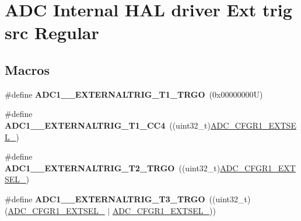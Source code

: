 \hypertarget{group___a_d_c___internal___h_a_l__driver___ext__trig__src___regular}{}\section{A\+DC Internal H\+AL driver Ext trig src Regular}
\label{group___a_d_c___internal___h_a_l__driver___ext__trig__src___regular}
\subsection*{Macros}
\begin{DoxyCompactItemize}
\item 
\mbox{\label{group___a_d_c___internal___h_a_l__driver___ext__trig__src___regular_gaaa9a402d55b7d3b9412ad2d9c8b3c596}} 
\#define {\bfseries A\+D\+C1\+\_\+\_\+\+E\+X\+T\+E\+R\+N\+A\+L\+T\+R\+I\+G\+\_\+\+T1\+\_\+\+T\+R\+GO}~(0x00000000\+U)
\item 
\mbox{\label{group___a_d_c___internal___h_a_l__driver___ext__trig__src___regular_ga67ffe1784bc032efb1ea187d8aefc7d1}} 
\#define {\bfseries A\+D\+C1\+\_\+\_\+\+E\+X\+T\+E\+R\+N\+A\+L\+T\+R\+I\+G\+\_\+\+T1\+\_\+\+C\+C4}~((uint32\+\_\+t)\hyperlink{group___peripheral___registers___bits___definition_ga6b23e26a7ff780ae4a913f9eb3c4fafb}{A\+D\+C\+\_\+\+C\+F\+G\+R1\+\_\+\+E\+X\+T\+S\+E\+L\+\_})
\item 
\mbox{\label{group___a_d_c___internal___h_a_l__driver___ext__trig__src___regular_ga4f651a2afa7c5e18d9ad2e3f5742d1c1}} 
\#define {\bfseries A\+D\+C1\+\_\+\_\+\+E\+X\+T\+E\+R\+N\+A\+L\+T\+R\+I\+G\+\_\+\+T2\+\_\+\+T\+R\+GO}~((uint32\+\_\+t)\hyperlink{group___peripheral___registers___bits___definition_gabd08752ec8996d12b0dbf1b555f4a67f}{A\+D\+C\+\_\+\+C\+F\+G\+R1\+\_\+\+E\+X\+T\+S\+E\+L\+\_})
\item 
\mbox{\label{group___a_d_c___internal___h_a_l__driver___ext__trig__src___regular_ga0ba310c2b48bef9a7efb244a057c743b}} 
\#define {\bfseries A\+D\+C1\+\_\+\_\+\+E\+X\+T\+E\+R\+N\+A\+L\+T\+R\+I\+G\+\_\+\+T3\+\_\+\+T\+R\+GO}~((uint32\+\_\+t)(\hyperlink{group___peripheral___registers___bits___definition_gabd08752ec8996d12b0dbf1b555f4a67f}{A\+D\+C\+\_\+\+C\+F\+G\+R1\+\_\+\+E\+X\+T\+S\+E\+L\+\_} $\vert$ \hyperlink{group___peripheral___registers___bits___definition_ga6b23e26a7ff780ae4a913f9eb3c4fafb}{A\+D\+C\+\_\+\+C\+F\+G\+R1\+\_\+\+E\+X\+T\+S\+E\+L\+\_}))

\end{DoxyCompactItemize}
